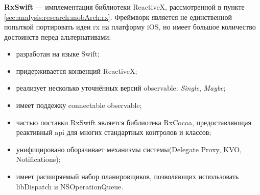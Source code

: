 \subsubsection{}
\label{sec:development:arch:ios:rxswift}

\textbf{RxSwift} --- имплементация библиотеки ReactiveX, рассмотренной в пункте \ref{sec:analysis:research:mobArch:rx}. Фреймворк является не единственной попыткой портировать идеи \gls{rx} на платформу iOS, но имеет большое количество достоинств перед альтернативами:

\begin{itemize}
	\item разработан на языке Swift;
	\item придерживается конвенций ReactiveX;
	\item реализует несколько уточнённых версий \gls{observable}: \textit{Single}, \textit{Maybe};
	\item имеет поддежку connectable \gls{observable};
	\item частью поставки RxSwift является библиотека RxCocoa, предоставляющая реактивный \gls{api} для многих стандартных контролов и классов;
	\item унифицировано оборачивает механизмы системы(Delegate Proxy, KVO, Notifications);
	\item имеет расширяемый набор планировщиков, позволяющих использовать libDispatch и NSOperationQueue.
\end{itemize}